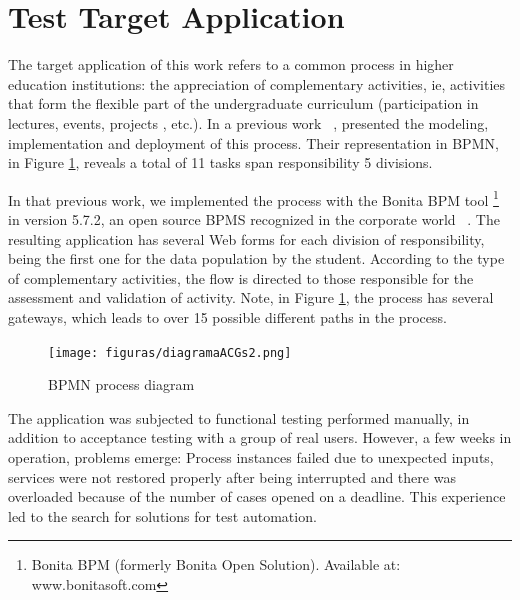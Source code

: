 \documentclass[runningheads,a4paper]{llncs}
\begin{document}
\section{Test Target Application}\label{s:apli}


The target application of this work refers to a common process in higher education institutions: the appreciation of complementary activities, ie, activities that form the flexible part of the undergraduate curriculum (participation in lectures, events, projects , etc.). In a previous work ~\cite{sbsi2013}, presented the modeling, implementation and deployment of this process. Their representation in BPMN, in Figure \ref{fig:diagrama}, reveals a total of 11 tasks span responsibility 5 divisions.

In that previous work, we implemented the process with the Bonita BPM tool \footnote{Bonita BPM (formerly Bonita Open Solution). Available at: www.bonitasoft.com} in version 5.7.2, an open source BPMS recognized in the corporate world ~\cite{forrester}. The resulting application has several Web forms for each division of responsibility, being the first one for the data population by the student. According to the type of complementary activities, the flow is directed to those responsible for the assessment and validation of activity. Note, in Figure \ref{fig:diagrama}, the process has several gateways, which leads to over 15 possible different paths in the process.

\begin{figure}[ht]
\centering
\texttt{[image: figuras/diagramaACGs2.png]}
\caption{BPMN process diagram}
\label{fig:diagrama}
\end{figure}

The application was subjected to functional testing performed manually, in addition to acceptance testing with a group of real users. However, a few weeks in operation, problems emerge: Process instances failed due to unexpected inputs, services were not restored properly after being interrupted and there was overloaded because of the number of cases opened on a deadline. This experience led to the search for solutions for test automation.
\end{document}
